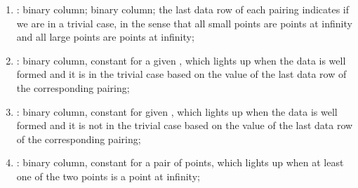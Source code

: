 \begin{enumerate}[resume]
      \item \trivialAcc: binary column; binary column; the last data row of each pairing indicates if we are in a trivial case, in the sense that all small points are points at infinity and all large points are points at infinity;
      \item \both{\wellformedDataTrivial}: binary column, constant for a given \blsId, which lights up when the data is well formed and it is in the trivial case based on the value of the last data row of the corresponding pairing;
      \item \both{\wellformedDataNonTrivial}: binary column, constant for  given \blsId, which lights up when the data is well formed and it is not in the trivial case based on the value of the last data row of the corresponding pairing;
      \item \both{\pairOfPointsContainsInfinity}: binary column, constant for a pair of points, which lights up when at least one of the two points is a point at infinity;




\end{enumerate}
